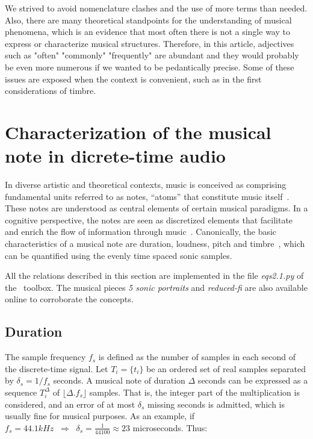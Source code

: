 We strived to avoid nomenclature clashes and the use of more terms than needed.
Also, there are many theoretical standpoints for the understanding of musical phenomena,
which is an evidence that most often there is not a single way to express or characterize musical structures.
Therefore, in this article, adjectives such as "often" "commonly" "frequently" are abundant and they would probably be even more numerous if we wanted to be pedantically precise.
Some of these issues are exposed when the context is convenient, such as in the first considerations of timbre.

\section{Characterization of the musical note in dicrete-time audio} \label{sec:discNote}\label{sec:notaDisc}
In diverse artistic and theoretical contexts, music is conceived as comprising fundamental units referred to as notes, ``atoms'' that constitute music itself~\cite{Wisnick, Lovelock, Webern}.
These notes are understood as central elements of certain musical paradigms.
In a cognitive perspective, the notes are seen as discretized elements that facilitate and enrich the flow of information through music~\cite{Roederer, Lacerda}.
Canonically, the basic characteristics of a musical note are duration, loudness, pitch and timbre~\cite{Lacerda}, which can be quantified using the evenly time spaced sonic samples.

All the relations described in this section are implemented in the file \emph{eqs2.1.py} of the \massa\ toolbox. The musical pieces \emph{5 sonic portraits} and \emph{reduced-fi} are also available online to corroborate the concepts.

\subsection{Duration}
The sample frequency $f_s$ is defined as the number of samples in each second of the discrete-time signal. Let $T_i=\{t_i\}$ be an ordered set of real samples separated by $\delta_s=1/f_s$ seconds.
A musical note of duration $\Delta$ seconds can be expressed as a sequence $T_i^{\Delta}$ of $\lfloor \Delta . f_s \rfloor$ samples.
That is, the integer part of the multiplication is considered, and an error of at most $\delta_s$ missing seconds is admitted, which is usually fine for musical purposes. As an example, if $f_s=44.1kHz \;\;\Rightarrow\;\;\delta_s=\frac{1}{44100}\approx 23$ microseconds. Thus:


